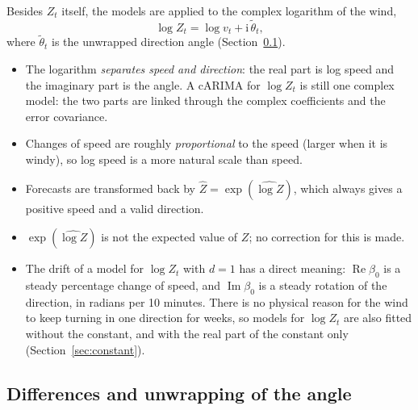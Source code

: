 \documentclass[11pt,a4paper]{article}
\newcommand{\iu}{\mathrm{i}}
\newcommand{\1}{\mathbf{1}}
\renewcommand{\Re}{\operatorname{Re}}
\renewcommand{\Im}{\operatorname{Im}}
\begin{document}
Besides $Z_t$ itself, the models are applied to the complex logarithm of the wind,
\begin{equation}
  \log Z_t = \log v_t + \iu\,\tilde\theta_t ,
\end{equation}
where $\tilde\theta_t$ is the unwrapped direction angle (Section~\ref{sec:diff}).
\begin{itemize}
  \item The logarithm \emph{separates speed and direction}: the real part is log speed and the
    imaginary part is the angle. A cARIMA for $\log Z_t$ is still one complex model: the two parts
    are linked through the complex coefficients and the error covariance.
  \item Changes of speed are roughly \emph{proportional} to the speed (larger when it is windy), so
    log speed is a more natural scale than speed.
  \item Forecasts are transformed back by $\hat Z = \exp(\widehat{\log Z})$, which always gives a
    positive speed and a valid direction.
  \item $\exp(\widehat{\log Z})$ is not the expected value of $Z$; no correction for this is made.
  \item The drift of a model for $\log Z_t$ with $d = 1$ has a direct meaning: $\Re\beta_0$ is a
    steady percentage change of speed, and $\Im\beta_0$ is a steady rotation of the direction, in
    radians per 10 minutes. There is no physical reason for the wind to keep turning in one
    direction for weeks, so models for $\log Z_t$ are also fitted without the constant, and with
    the real part of the constant only (Section~\ref{sec:constant}).
\end{itemize}

\subsection{Differences and unwrapping of the angle}\label{sec:diff}
\end{document}

